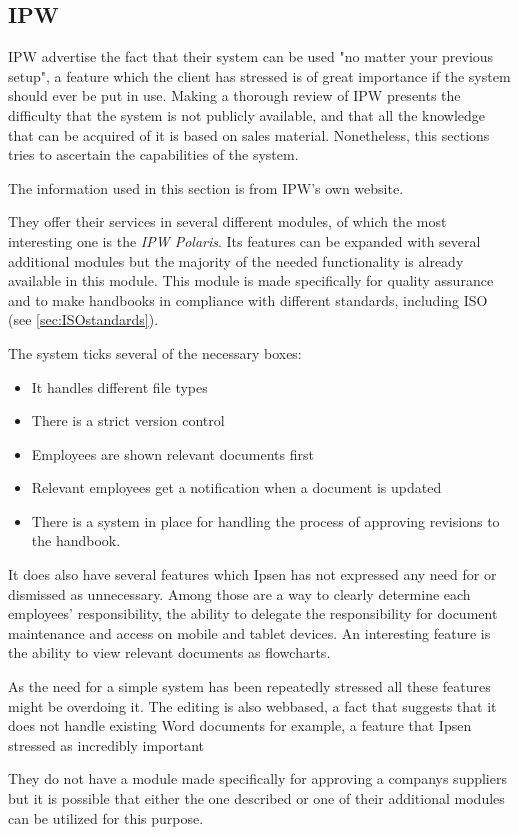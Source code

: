 \subsection{IPW}
IPW advertise the fact that their system can be used "no matter your previous setup", a feature which the client has stressed is of great importance if the system should ever be put in use.
Making a thorough review of IPW presents the difficulty that the system is not publicly available, and that all the knowledge that can be acquired of it is based on sales material.
Nonetheless, this sections tries to ascertain the capabilities of the system.

The information used in this section is from IPW's own website\cite{IPW}.

They offer their services in several different modules, of which the most interesting one is the \textit{IPW Polaris}.
Its features can be expanded with several additional modules but the majority of the needed functionality is already available in this module.
This module is made specifically for quality assurance and to make handbooks in compliance with different standards, including ISO (see \cref{sec:ISOstandards}).

The system ticks several of the necessary boxes: 

\begin{itemize}
        \item It handles different file types
        \item There is a strict version control
        \item Employees are shown relevant documents first
        \item Relevant employees get a notification when a document is updated
        \item There is a system in place for handling the process of approving revisions to the handbook.
\end{itemize}

It does also have several features which Ipsen has not expressed any need for or dismissed as unnecessary.
Among those are a way to clearly determine each employees' responsibility, the ability to delegate the responsibility for document maintenance and access on mobile and tablet devices.
An interesting feature is the ability to view relevant documents as flowcharts.

As the need for a simple system has been repeatedly stressed all these features might be overdoing it.
The editing is also webbased, a fact that suggests that it does not handle existing Word documents for example, a feature that Ipsen stressed as incredibly important

They do not have a module made specifically for approving a companys suppliers but it is possible that either the one described or one of their additional modules can be utilized for this purpose.
